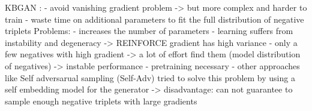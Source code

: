 KBGAN
\cite{zhang2021efficient}:
- avoid vanishing gradient problem 
-> but more complex and harder to train
- waste time on additional parameters to fit the full distribution of negative triplets
Problems: - increases the number of parameters
- learning suffers from instability and degeneracy
-> REINFORCE gradient has high variance
- only a few negatives with high gradient -> a lot of effort find them (model distribution of negatives)
-> instable performance
- pretraining necessary
- other approaches like Self adversarual sampling (Self-Adv) tried to solve this problem by using a self embedding model for the generator
-> disadvantage: can not guarantee to sample enough negative triplets with large gradients 
